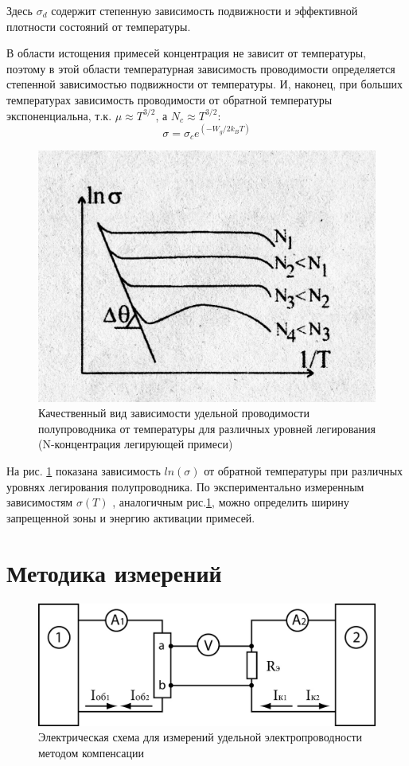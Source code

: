 Здесь $\sigma_d$ содержит степенную зависимость подвижности и эффективной плотности состояний от температуры.

В области истощения примесей концентрация не зависит от температуры, поэтому в этой области температурная зависимость проводимости определяется
степенной зависимостью подвижности от температуры. И, наконец, при больших температурах зависимость проводимости от
обратной температуры экспоненциальна, т.к. $\mu \approx T^{3/2}$, а  $N_c \approx T^{3/2}$:
 \begin{equation}
	\sigma=\sigma_{c} e^{\left(-W_{g} / 2 k_{B} T\right)}
	 \label{eq:4.4}
 \end{equation}
 \begin{figure}[h!]
	\centering
	\includegraphics[width = .5\linewidth]{img/41.jpg}
	\caption{Качественный вид зависимости удельной проводимости полупроводника от температуры для различных уровней легирования (N-концентрация легирующей примеси)}
	\label{fig:4.1}
\end{figure}
 
 На рис. \ref{fig:4.1} показана зависимость $ln(\sigma)$ от обратной температуры при различных уровнях легирования полупроводника. По
 экспериментально измеренным зависимостям $\sigma(T)$ , аналогичным рис.\ref{fig:4.1}, можно определить ширину запрещенной зоны и
 энергию активации примесей. 

\section{Методика измерений}

\begin{figure}[h!]
	\centering
	\includegraphics[width = .9\linewidth]{img/scheme.jpg}
	\caption{Электрическая схема для измерений удельной электропроводности методом компенсации}
	\label{fig:5.1}
\end{figure}

